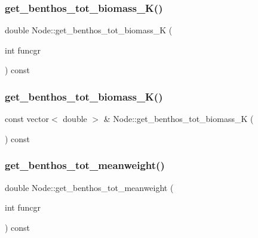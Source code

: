 \mbox{\label{class_node_a157face21334697b3048d1d87ebea67f}} 
\subsubsection{\texorpdfstring{get\_benthos\_tot\_biomass\_K()}{get\_benthos\_tot\_biomass\_K()}\hspace{0.1cm}{\footnotesize\ttfamily [1/2]}}
{\footnotesize\ttfamily double Node\+::get\+\_\+benthos\+\_\+tot\+\_\+biomass\+\_\+K (\begin{DoxyParamCaption}\item[{int}]{funcgr }\end{DoxyParamCaption}) const}

\mbox{\label{class_node_a123c40a385fc7ea4ae162a091257d508}} 
\subsubsection{\texorpdfstring{get\_benthos\_tot\_biomass\_K()}{get\_benthos\_tot\_biomass\_K()}\hspace{0.1cm}{\footnotesize\ttfamily [2/2]}}
{\footnotesize\ttfamily const vector$<$ double $>$ \& Node\+::get\+\_\+benthos\+\_\+tot\+\_\+biomass\+\_\+K (\begin{DoxyParamCaption}{ }\end{DoxyParamCaption}) const}

\mbox{\label{class_node_aa8c8a2072a85fdb4bdd45254e3c9d61d}} 
\subsubsection{\texorpdfstring{get\_benthos\_tot\_meanweight()}{get\_benthos\_tot\_meanweight()}\hspace{0.1cm}{\footnotesize\ttfamily [1/2]}}
{\footnotesize\ttfamily double Node\+::get\+\_\+benthos\+\_\+tot\+\_\+meanweight (\begin{DoxyParamCaption}\item[{int}]{funcgr }\end{DoxyParamCaption}) const}

